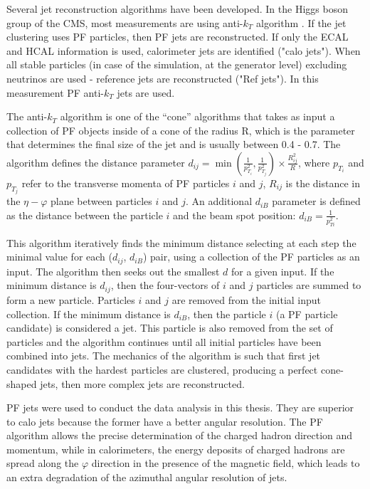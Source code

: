 Several jet reconstruction algorithms have been developed. In the Higgs boson group of the CMS, most measurements are using anti-$k_T$ algorithm \cite{antiKt}. If the jet clustering uses PF particles, then PF jets are reconstructed. If only the ECAL and HCAL information is used, calorimeter jets are identified ("calo jets"). When all stable particles (in case of the simulation, at the generator level) excluding neutrinos are used - reference jets are reconstructed ("Ref jets"). In this measurement PF anti-$k_T$ jets are used. 

The anti-$k_T$ algorithm is one of the ``cone'' algorithms that takes as input a collection of PF objects inside of a cone of the radius R, which is the parameter that determines the final size of the jet and is usually between 0.4 - 0.7. The algorithm defines the distance parameter
$d_{ij} = \min (\frac{1}{p^2_{T_i}}, \frac{1}{p^2_{T_j}}) \times \frac{R^2_{ij}}{R}$, where $p_{T_i}$ and $p_{T_j}$ refer to the transverse momenta of PF particles $i$ and $j$, $R_{ij}$ is the distance in the $\eta - \varphi$ plane between particles $i$ and $j$. An additional $d_{iB}$ parameter is defined as the distance between the particle $i$ and the beam spot position: $d_{iB} = \frac{1}{p^2_{Ti} }$.

This algorithm iteratively finds the minimum distance selecting at each step the minimal value for each ($d_{ij}$, $d_{iB}$) pair, using a collection of the PF particles as an input. The algorithm then seeks out the smallest $d$ for a given input. If the minimum distance is $d_{ij}$, then the four-vectors of $i$ and $j$ particles are summed to form a new particle. Particles $i$ and $j$ are removed from the initial input collection. If the minimum distance is $d_{iB}$, then the particle $i$ (a PF particle candidate) is considered a jet. This particle is also removed from the set of particles and the algorithm continues until all initial particles have been combined into jets. The mechanics of the algorithm is such that first jet candidates with the hardest particles are clustered, producing a perfect cone-shaped jets, then more complex jets are reconstructed.

PF jets were used to conduct the data analysis in this thesis. They are superior to calo jets because the former have a better angular resolution. The PF algorithm allows the precise determination of the charged hadron direction and momentum, while in calorimeters, the energy deposits of charged hadrons are spread along the $\varphi$ direction in the presence of the magnetic field, which leads to an extra degradation of the azimuthal angular resolution of jets.

